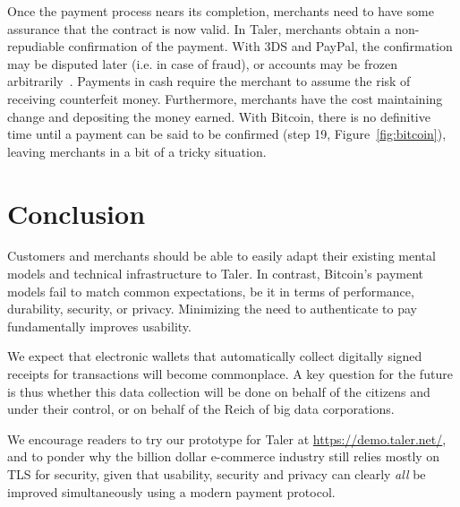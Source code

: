 \documentclass{IEEEtran}
\begin{document}
Once the payment process nears its completion, merchants need to have
some assurance that the contract is now valid.  In Taler, merchants
obtain a non-repudiable confirmation of the payment.  With 3DS and
PayPal, the confirmation may be disputed later (i.e. in case of
fraud), or accounts may be frozen arbitrarily~\cite{diaspora2011}.
Payments in cash require the merchant to assume the risk of receiving
counterfeit money.
Furthermore, merchants have the cost maintaining change and depositing
the money earned.  With Bitcoin, there is no definitive time until a
payment can be said to be confirmed (step 19, Figure~\ref{fig:bitcoin}),
leaving merchants in a bit of a tricky situation.

\section{Conclusion}

Customers and merchants should be able to easily adapt their existing
mental models and technical infrastructure to Taler.  In contrast,
Bitcoin's payment models fail to match common expectations, be it in
terms of performance, durability, security, or privacy.  Minimizing
the need to authenticate to pay fundamentally improves usability.

We expect that electronic wallets that automatically collect digitally
signed receipts for transactions will become commonplace.  A key
question for the future is thus whether this data collection will be
done on behalf of the citizens and under their control, or on behalf
of the Reich of big data corporations.

We encourage readers to try our prototype for Taler
at \url{https://demo.taler.net/}, and to ponder why the billion dollar
e-commerce industry still relies mostly on TLS for security, given
that usability, security and privacy can clearly {\em all} be improved
simultaneously using a modern payment protocol.

\end{document}
